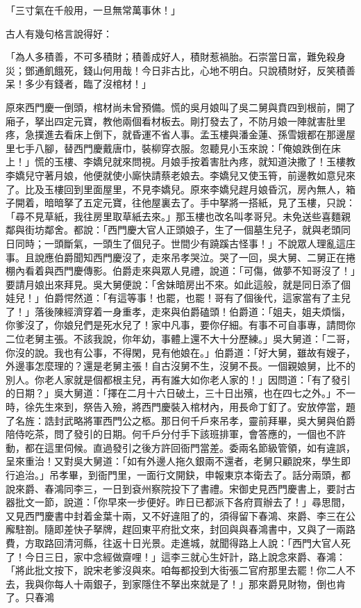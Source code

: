 \begin{showcontents}{}
「三寸氣在千般用，一旦無常萬事休！」

古人有幾句格言說得好：

「為人多積善，不可多積財；積善成好人，積財惹禍胎。石崇當日富，難免殺身災；鄧通飢餓死，錢山何用哉！今日非古比，心地不明白。只說積財好，反笑積善呆！多少有錢者，臨了沒棺材！」

原來西門慶一倒頭，棺材尚未曾預備。慌的吳月娘叫了吳二舅與賁四到根前，開了廂子，拏出四定元寶，教他兩個看材板去。剛打發去了，不防月娘一陣就害肚里疼，急撲進去看床上倒下，就昏運不省人事。孟玉樓與潘金蓮、孫雪娥都在那邊屋里七手八腳，替西門慶戴唐巾，裝柳穿衣服。忽聽見小玉來說：「俺娘跌倒在床上！」慌的玉樓、李嬌兒就來問視。月娘手按着害肚內疼，就知道決撒了！玉樓教李嬌兒守著月娘，他便就使小廝快請蔡老娘去。李嬌兒又使玉筲，前邊教如意兒來了。比及玉樓回到里面屋里，不見李嬌兒。原來李嬌兒趕月娘昏沉，房內無人，箱子開着，暗暗拏了五定元寶，往他屋裏去了。手中拏將一搭紙，見了玉樓，只說：「尋不見草紙，我往房里取草紙去來。」那玉樓也改名叫孝哥兒。未免送些喜麵親鄰與街坊鄰舍。都說：「西門慶大官人正頭娘子，生了一個墓生兒子，就與老頭同日同時；一頭斷氣，一頭生了個兒子。世間少有蹺蹊古怪事！」不說眾人理亂這庄事。且說應伯爵聞知西門慶沒了，走來吊孝哭泣。哭了一回，吳大舅、二舅正在捲棚內看着與西門慶傳影。伯爵走來與眾人見禮，說道：「可傷，做夢不知哥沒了！」要請月娘出來拜見。吳大舅便說：「舍妹暗房出不來。如此這般，就是同日添了個娃兒！」伯爵愕然道：「有這等事！也罷，也罷！哥有了個後代，這家當有了主兒了！」落後陳經濟穿着一身重孝，走來與伯爵磕頭！伯爵道：「姐夫，姐夫煩惱，你爹沒了，你娘兒們是死水兒了！家中凡事，要你仔細。有事不可自事專，請問你二位老舅主張。不該我說，你年幼，事體上還不大十分歷練。」吳大舅道：「二哥，你沒的說。我也有公事，不得閑，見有他娘在。」伯爵道：「好大舅，雖故有嫂子，外邊事怎麼理的？還是老舅主張！自古沒舅不生，沒舅不長。一個親娘舅，比不的別人。你老人家就是個都根主兒，再有誰大如你老人家的！」因問道：「有了發引的日期？」吳大舅道：「擇在二月十六日破土，三十日出殯，也在四七之外。」不一時，徐先生來到，祭告入殮，將西門慶裝入棺材內，用長命丁釘了。安放停當，題了名旌：誥封武略將軍西門公之柩。那日何千戶來吊孝，靈前拜畢，吳大舅與伯爵陪侍吃茶，問了發引的日期。何千戶分付手下該班排軍，會答應的，一個也不許動，都在這里伺候。直過發引之後方許回衙門當差。委兩名節級管領，如有違誤，呈來重治！又對吳大舅道：「如有外邊人拖久銀兩不還者，老舅只顧說來，學生即行追治。」吊孝畢，到衙門里，一面行文開鈌，申報東京本衛去了。話分兩頭，都說來爵、春鴻同李三，一日到袞州察院投下了書禮。宋御史見西門慶書上，要討古器批文一節，說道：「你早來一步便好。昨日已都派下各府買辦去了！」尋思間，又見西門慶書中封着金葉十兩，又不好違阻了的，須得留下春鴻、來爵、李三在公廨駐劄。隨即差快子拏牌，趕回東平府批文來，封回與與春鴻書中，又與了一兩路費，方取路回清河縣，往返十日光景。走進城，就聞得路上人說：「西門大官人死了！今日三日，家中念經做齋哩！」這李三就心生奸計，路上說念來爵、春鴻：「將此批文按下，說宋老爹沒與來。咱每都投到大街張二官府那里去罷！你二人不去，我與你每人十兩銀子，到家隱住不拏出來就是了！」那來爵見財物，倒也肯了。只春鴻
\end{showcontents}
